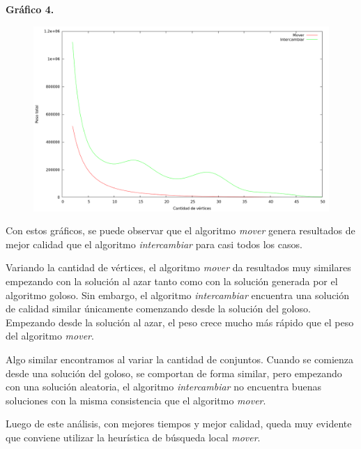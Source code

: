\textbf{Gráfico 4.}
\begin{figure}[H]
  \begin{center}
    \includegraphics[scale=0.35]{imagenes/local-random-k-peso.png}
  \end{center}
\end{figure}

\vspace*{0.5cm}

Con estos gráficos, se puede observar que el algoritmo \textit{mover} genera
resultados de mejor calidad que el algoritmo \textit{intercambiar} para casi
todos los casos.

Variando la cantidad de vértices, el algoritmo \textit{mover} da resultados muy
similares empezando con la solución al azar tanto como con la solución generada
por el algoritmo goloso. Sin embargo, el algoritmo \textit{intercambiar}
encuentra una solución de calidad similar únicamente comenzando desde la
solución del goloso. Empezando desde la solución al azar, el peso crece mucho
más rápido que el peso del algoritmo \textit{mover}.

\vspace{0.25cm}

Algo similar encontramos al variar la cantidad de conjuntos. Cuando se comienza
desde una solución del goloso, se comportan de forma similar, pero empezando
con una solución aleatoria, el algoritmo \textit{intercambiar} no encuentra
buenas soluciones con la misma consistencia que el algoritmo \textit{mover}.

Luego de este análisis, con mejores tiempos y mejor calidad, queda muy evidente
que conviene utilizar la heurística de búsqueda local \textit{mover}.

